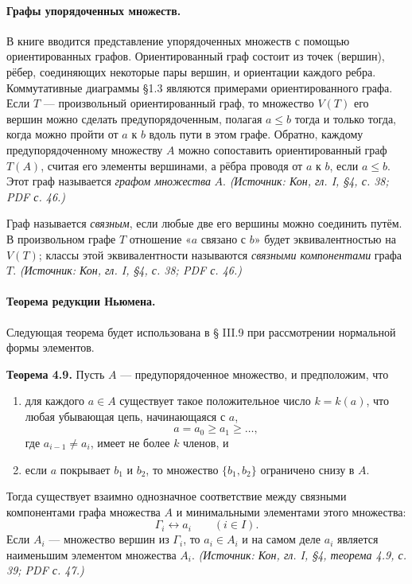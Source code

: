 \documentclass[a4paper,12pt]{article}
\begin{document}
\paragraph{Графы упорядоченных множеств.}
В книге вводится представление упорядоченных множеств с помощью ориентированных графов. Ориентированный граф состоит из точек (вершин), рёбер, соединяющих некоторые пары вершин, и ориентации каждого ребра. Коммутативные диаграммы §1.3 являются примерами ориентированного графа. Если \(T\) — произвольный ориентированный граф, то множество \(V(T)\) его вершин можно сделать предупорядоченным, полагая \(a\le b\) тогда и только тогда, когда можно пройти от \(a\) к \(b\) вдоль пути в этом графе. Обратно, каждому предупорядоченному множеству \(A\) можно сопоставить ориентированный граф \(T(A)\), считая его элементы вершинами, а рёбра проводя от \(a\) к \(b\), если \(a\le b\). Этот граф называется \emph{графом множества} \(A\).
\textit{(Источник: Кон, гл. I, §4, с. 38; PDF с. 46.)}

Граф называется \emph{связным}, если любые две его вершины можно соединить путём. В произвольном графе \(T\) отношение «\(a\) связано с \(b\)» будет эквивалентностью на \(V(T)\); классы этой эквивалентности называются \emph{связными компонентами} графа \(T\).
\textit{(Источник: Кон, гл. I, §4, с. 38; PDF с. 46.)}

\paragraph{Теорема редукции Ньюмена.}
Следующая теорема будет использована в § III.9 при рассмотрении нормальной формы элементов.

\textbf{Теорема 4.9.} Пусть \(A\) — предупорядоченное множество, и предположим, что
\begin{enumerate}[label=(\roman*)]
\item для каждого \(a\in A\) существует такое положительное число \(k=k(a)\), что любая убывающая цепь, начинающаяся с \(a\),
\[
a=a_0\ge a_1\ge\ldots,
\]
где \(a_{i-1}\ne a_i\), имеет не более \(k\) членов, и
\item если \(a\) покрывает \(b_1\) и \(b_2\), то множество \(\{b_1,b_2\}\) ограничено снизу в \(A\).
\end{enumerate}
Тогда существует взаимно однозначное соответствие между связными компонентами графа множества \(A\) и минимальными элементами этого множества:
\[
\Gamma_i\leftrightarrow a_i\qquad(i\in I).
\]
Если \(A_i\) — множество вершин из \(\Gamma_i\), то \(a_i\in A_i\) и на самом деле \(a_i\) является наименьшим элементом множества \(A_i\).
\textit{(Источник: Кон, гл. I, §4, теорема 4.9, с. 39; PDF с. 47.)}
\end{document}
